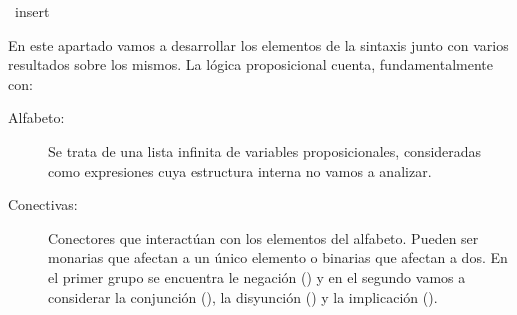 %
\begin{isabellebody}%
%
%
\isadelimtheory
%
\endisadelimtheory
%
\isatagtheory
%
\endisatagtheory
{\isafoldtheory}%
%
\isadelimtheory
%
\endisadelimtheory
%
\isadelimdocument
%
\endisadelimdocument
%
\isatagdocument
%
\isamarkuptrue%
%
\endisatagdocument
{\isafolddocument}%
%
\isadelimdocument
%
\endisadelimdocument
{}\isamarkupfalse%
\ insert\ {\isacharparenleft}{\isachardoublequoteopen}{\isacharunderscore}\ {\isasymtriangleright}\ {\isacharunderscore}{\isachardoublequoteclose}\ {\isacharbrackleft}{}{}{\isacharcomma}{}{}{\isacharbrackright}\ {}{}{\isacharparenright}%
\begin{isamarkuptext}%
En este apartado vamos a desarrollar los elementos de la sintaxis junto con varios resultados 
sobre los mismos. La lógica proposicional cuenta, fundamentalmente con:
\begin{description}
    \item[Alfabeto:] Se trata de una lista infinita de variables proposicionales, consideradas como 
expresiones cuya estructura interna no vamos a analizar.
    \item[Conectivas:] Conectores que interactúan con los elementos del alfabeto. Pueden ser monarias que afectan a 
un único elemento o binarias que afectan a dos. En el primer grupo se encuentra le negación (\isa{{\isasymnot}}) y 
en el segundo vamos a considerar la conjunción (\isa{{\isasymand}}), la disyunción (\isa{{\isasymor}}) y la implicación (\isa{{\isasymlongrightarrow}}).
\end{description}


\end{isamarkuptext}
\end{isabellebody}
